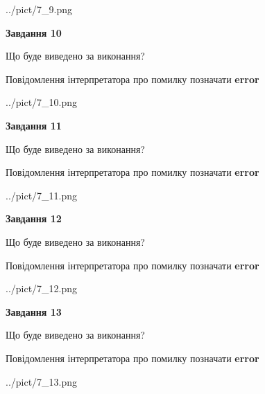 \documentclass[11pt, ukrainian]{article}
\begin{document}
{\begin {large}
\begin{center}
	{../pict/7_9.png}
\end{center}
\newpage

{\begin {center}\textbf{Завдання 10}\end {center}}\par
Що буде виведено за виконання? \par
Повідомлення інтерпретатора про помилку позначати \textbf{error}

\begin{center}
	{../pict/7_10.png}
\end{center}
\newpage

{\begin {center}\textbf{Завдання 11}\end {center}}\par
Що буде виведено за виконання? \par
Повідомлення інтерпретатора про помилку позначати \textbf{error}

\begin{center}
	{../pict/7_11.png}
\end{center}
\newpage

{\begin {center}\textbf{Завдання 12}\end {center}}\par
Що буде виведено за виконання? \par
Повідомлення інтерпретатора про помилку позначати \textbf{error}

\begin{center}
	{../pict/7_12.png}
\end{center}
\newpage

{\begin {center}\textbf{Завдання 13}\end {center}}\par
Що буде виведено за виконання? \par
Повідомлення інтерпретатора про помилку позначати \textbf{error}

\begin{center}
	{../pict/7_13.png}
\end{center}
\newpage


\end{large}}
\end{document}
